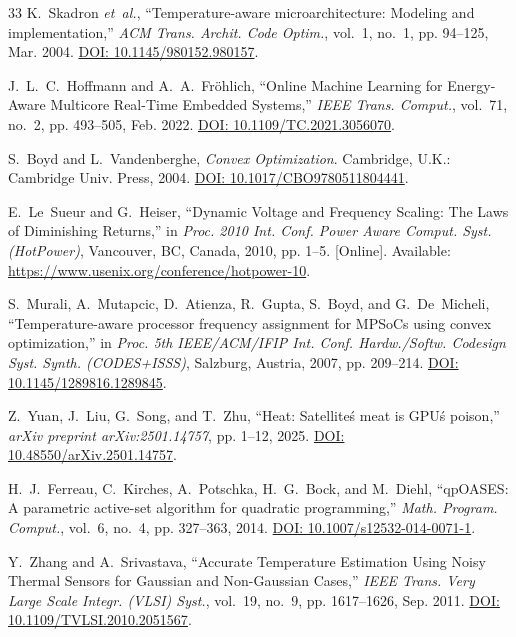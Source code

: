 \documentclass[journal]{IEEEtran}
\begin{document}
\begin{thebibliography}{33}
K.~Skadron \emph{et~al.}, ``Temperature-aware microarchitecture: Modeling and implementation,'' \emph{ACM Trans. Archit. Code Optim.}, vol.~1, no.~1, pp. 94--125, Mar. 2004. \href{https://doi.org/10.1145/980152.980157}{DOI: 10.1145/980152.980157}.

J.~L.~C.~Hoffmann and A.~A.~Fr{\"o}hlich, ``Online Machine Learning for Energy-Aware Multicore Real-Time Embedded Systems,'' \emph{IEEE Trans. Comput.}, vol.~71, no.~2, pp. 493--505, Feb. 2022. \href{https://doi.org/10.1109/TC.2021.3056070}{DOI: 10.1109/TC.2021.3056070}.

S.~Boyd and L.~Vandenberghe, \emph{Convex Optimization}. Cambridge, U.K.: Cambridge Univ. Press, 2004. \href{https://doi.org/10.1017/CBO9780511804441}{DOI: 10.1017/CBO9780511804441}.

E.~Le~Sueur and G.~Heiser, ``Dynamic Voltage and Frequency Scaling: The Laws of Diminishing Returns,'' in \emph{Proc. 2010 Int. Conf. Power Aware Comput. Syst. (HotPower)}, Vancouver, BC, Canada, 2010, pp. 1--5. [Online]. Available: \url{https://www.usenix.org/conference/hotpower-10}.

S.~Murali, A.~Mutapcic, D.~Atienza, R.~Gupta, S.~Boyd, and G.~De~Micheli, ``Temperature-aware processor frequency assignment for MPSoCs using convex optimization,'' in \emph{Proc. 5th IEEE/ACM/IFIP Int. Conf. Hardw./Softw. Codesign Syst. Synth. (CODES+ISSS)}, Salzburg, Austria, 2007, pp. 209--214. \href{https://doi.org/10.1145/1289816.1289845}{DOI: 10.1145/1289816.1289845}.

Z.~Yuan, J.~Liu, G.~Song, and T.~Zhu, ``Heat: Satellite\'s meat is GPU\'s poison,'' \emph{arXiv preprint arXiv:2501.14757}, pp. 1--12, 2025. \href{https://doi.org/10.48550/arXiv.2501.14757}{DOI: 10.48550/arXiv.2501.14757}.

H.~J.~Ferreau, C.~Kirches, A.~Potschka, H.~G.~Bock, and M.~Diehl, ``qpOASES: A parametric active-set algorithm for quadratic programming,'' \emph{Math. Program. Comput.}, vol.~6, no.~4, pp. 327--363, 2014. \href{https://doi.org/10.1007/s12532-014-0071-1}{DOI: 10.1007/s12532-014-0071-1}.

Y.~Zhang and A.~Srivastava, ``Accurate Temperature Estimation Using Noisy Thermal Sensors for Gaussian and Non-Gaussian Cases,'' \emph{IEEE Trans. Very Large Scale Integr. (VLSI) Syst.}, vol.~19, no.~9, pp. 1617--1626, Sep. 2011. \href{https://doi.org/10.1109/TVLSI.2010.2051567}{DOI: 10.1109/TVLSI.2010.2051567}.


\end{thebibliography}
\end{document}
